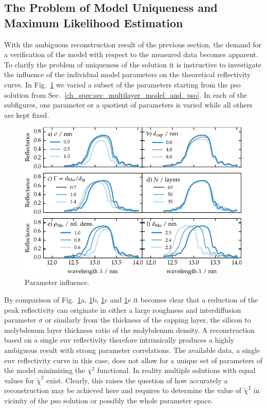 \subsection{The Problem of Model Uniqueness and Maximum Likelihood Estimation} \label{ch_spec:sec_maximum_likelihood}
With the ambiguous reconstruction result of the previous section, the demand for a verification of the model with respect to the measured data becomes apparent. To clarify the problem of uniqueness of the solution it is instructive to investigate the influence of the individual model parameters on the theoretical reflectivity curve. In Fig.~\ref{ch_spec:fig_mo_si_parameter_influence} we varied a subset of the parameters starting from the \gls{pso} solution from Sec.~\ref{ch_spec:sec_multilayer_model_and_pso}. In each of the subfigures, one parameter or a quotient of parameters is varied while all others are kept fixed.
\begin{figure}[htbp]
\centering
\includegraphics{img/parameter_influence}
\caption{Parameter influence.}
\label{ch_spec:fig_mo_si_parameter_influence}
\end{figure}
By comparison of Fig.~\ref{ch_spec:fig_mo_si_parameter_influence}a, \ref{ch_spec:fig_mo_si_parameter_influence}b, \ref{ch_spec:fig_mo_si_parameter_influence}c and \ref{ch_spec:fig_mo_si_parameter_influence}e it becomes clear that a reduction of the peak reflectivity can originate in either a large roughness and interdiffusion parameter $\sigma$ or similarly from the thickness of the capping layer, the silicon to molybdenum layer thickness ratio of the molybdenum density. A reconstruction based on a single \gls{euv} reflectivity therefore intrinsically produces a highly ambiguous result with strong parameter correlations. The available data, a single \gls{euv} reflectivity curve in this case, does not allow for a unique set of parameters of the model minimizing the $\chi^2$ functional. In reality multiple solutions with equal values for $\tilde{\chi}^2$ exist. Clearly, this raises the question of how accurately a reconstruction may be achieved here and requires to determine the value of $\tilde{\chi}^2$ in vicinity of the \gls{pso} solution or possibly the whole parameter space.

